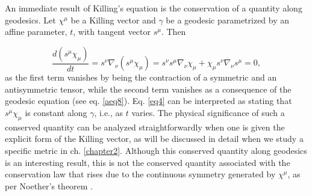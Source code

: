 \documentclass[
12pt,		%
openright,	%
twoside,  %
a4paper,			%
chapter=TITLE,		%
english,			%
french,				%
spanish,			%
brazil				%
]{USPSC-classe/USPSC}
\begin{document}
An immediate result of Killing's equation is the conservation of a quantity along geodesics. Let $\chi^{\mu}$ be a Killing vector and $\gamma$ be a geodesic parametrized by an affine parameter, $t$, with tangent vector $s^{\mu}$. Then

\begin{equation}\label{eq4}
    \frac{d(s^{\mu}\chi_{\mu})}{dt}=s^{\nu}\nabla_{\nu}(s^{\mu}\chi_{\mu}) =s^{\nu}s^{\mu}\nabla_{\nu}\chi_{\mu}+\chi_{\mu}s^{\nu}\nabla_{\nu}s^{\mu}=0,
\end{equation}
as the first term vanishes by being the contraction of a symmetric and an antisymmetric tensor, while the second term vanishes as a consequence of the geodesic equation (see eq. \ref{aeq8}). Eq. \ref{eq4} can be interpreted as stating that $s^{\mu}\chi_{\mu}$ is constant along $\gamma$, i.e., as $t$ varies. The physical significance of such a conserved quantity can be analyzed straightforwardly when one is given the explicit form of the Killing vector, as will be discussed in detail when we study a specific metric in ch. \ref{chapter2}. Although this conserved quantity along geodesics is an interesting result, this is not the conserved quantity associated with the conservation law that rises due to the continuous symmetry generated by $\chi^{\mu}$, as per Noether's theorem \cite{Greiner1996}.
\end{document}
